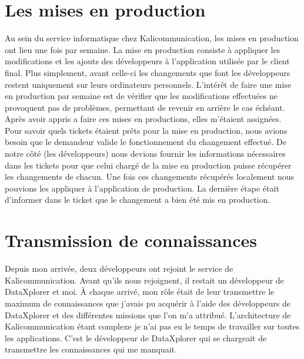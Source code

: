 \section{Les mises en production}
Au sein du service informatique chez Kalicommunication, les mises en production ont lieu une fois par semaine. La mise en production consiste à appliquer les modifications et les ajouts des développeurs à l'application utilisée par le client final. Plus simplement, avant celle-ci les changements que font les développeurs restent uniquement sur leurs ordinateurs personnels.\newline
L'intérêt de faire une mise en production par semaine est de vérifier que les modifications effectuées ne provoquent pas de problèmes, permettant de revenir en arrière le cas échéant.\newline
Après avoir appris a faire ces mises en productions, elles m'étaient assignées. Pour savoir quels tickets étaient prêts pour la mise en production, nous avions besoin que le demandeur valide le fonctionnement du changement effectué. De notre côté (les développeurs) nous devions fournir les informations nécessaires dans les tickets pour que celui chargé de la mise en production puisse récupérer les changements de chacun. Une fois ces changements récupérés localement nous pouvions les appliquer à l'application de production. La dernière étape était d'informer dans le ticket que le changement a bien été mis en production.

\section{Transmission de connaissances}
Depuis mon arrivée, deux développeurs ont rejoint le service de Kalicommunication. Avant qu'ils nous rejoignent, il restait un développeur de DataXplorer et moi. À chaque arrivé, mon rôle était de leur transmettre le maximum de connaissances que j'avais pu acquérir à l'aide des développeurs de DataXplorer et des différentes missions que l'on m'a attribué. L'architecture de Kalicommunication étant complexe je n'ai pas eu le temps de travailler sur toutes les applications. C'est le développeur de DataXplorer qui se chargeait de transmettre les connaissances qui me manquait.

